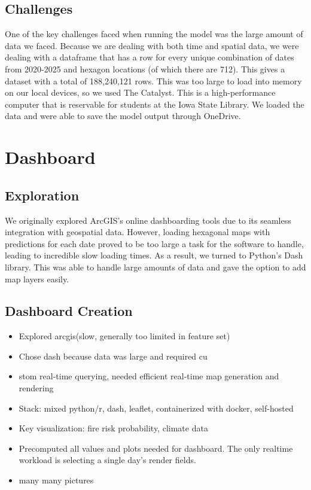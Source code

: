 \documentclass[
  12pt,
  letterpaper,
  DIV=11,
  numbers=noendperiod]{scrartcl}
\providecommand{\tightlist}{%
  \setlength{\itemsep}{0pt}\setlength{\parskip}{0pt}}\usepackage{longtable,booktabs,array}
\begin{document}
\subsection{Challenges}\label{challenges}

One of the key challenges faced when running the model was the large
amount of data we faced. Because we are dealing with both time and
spatial data, we were dealing with a dataframe that has a row for every
unique combination of dates from 2020-2025 and hexagon locations (of
which there are 712). This gives a dataset with a total of 188,240,121
rows. This was too large to load into memory on our local devices, so we
used The Catalyst. This is a high-performance computer that is
reservable for students at the Iowa State Library. We loaded the data
and were able to save the model output through OneDrive.

\section{Dashboard}\label{dashboard}

\subsection{Exploration}\label{exploration}

We originally explored ArcGIS's online dashboarding tools due to its
seamless integration with geospatial data. However, loading hexagonal
maps with predictions for each date proved to be too large a task for
the software to handle, leading to incredible slow loading times. As a
result, we turned to Python's Dash library. This was able to handle
large amounts of data and gave the option to add map layers easily.

\subsection{Dashboard Creation}\label{dashboard-creation}

\begin{itemize}
\tightlist
\item
  Explored arcgis(slow, generally too limited in feature set)\\
\item
  Chose dash because data was large and required cu\\
\item
  stom real-time querying, needed efficient real-time map generation and
  rendering\\
\item
  Stack: mixed python/r, dash, leaflet, containerized with docker,
  self-hosted\\
\item
  Key visualization: fire risk probability, climate data\\
\item
  Precomputed all values and plots needed for dashboard. The only
  realtime workload is selecting a single day's render fields.\\
\item
  many many pictures
\end{itemize}
\end{document}
